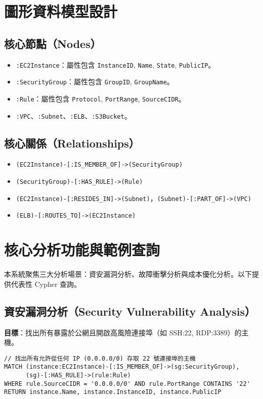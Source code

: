 \documentclass[11pt,a4paper]{ctexart}
\begin{document}
\section{圖形資料模型設計}

\subsection{核心節點（Nodes）}
\begin{itemize}[leftmargin=1.5em]
\item \texttt{:EC2Instance}：屬性包含 \texttt{InstanceID}, \texttt{Name}, \texttt{State}, \texttt{PublicIP}。
\item \texttt{:SecurityGroup}：屬性包含 \texttt{GroupID}, \texttt{GroupName}。
\item \texttt{:Rule}：屬性包含 \texttt{Protocol}, \texttt{PortRange}, \texttt{SourceCIDR}。
\item \texttt{:VPC}、\texttt{:Subnet}、\texttt{:ELB}、\texttt{:S3Bucket}。
\end{itemize}

\subsection{核心關係（Relationships）}
\begin{itemize}[leftmargin=1.5em]
\item \texttt{(EC2Instance)-[:IS\_MEMBER\_OF]->(SecurityGroup)}
\item \texttt{(SecurityGroup)-[:HAS\_RULE]->(Rule)}
\item \texttt{(EC2Instance)-[:RESIDES\_IN]->(Subnet)}，\texttt{(Subnet)-[:PART\_OF]->(VPC)}
\item \texttt{(ELB)-[:ROUTES\_TO]->(EC2Instance)}
\end{itemize}

\section{核心分析功能與範例查詢}\label{sec:analysis}
本系統聚焦三大分析場景：資安漏洞分析、故障衝擊分析與成本優化分析。以下提供代表性 Cypher 查詢。

\subsection{資安漏洞分析（Security Vulnerability Analysis）}
\textbf{目標}：找出所有暴露於公網且開啟高風險連接埠（如 SSH:22, RDP:3389）的主機。

\begin{lstlisting}[language=Cypher,caption={尋找允許 0.0.0.0/0 存取 22 埠之主機}]
// 找出所有允許從任何 IP (0.0.0.0/0) 存取 22 號連接埠的主機
MATCH (instance:EC2Instance)-[:IS_MEMBER_OF]->(sg:SecurityGroup),
      (sg)-[:HAS_RULE]->(rule:Rule)
WHERE rule.SourceCIDR = '0.0.0.0/0' AND rule.PortRange CONTAINS '22'
RETURN instance.Name, instance.InstanceID, instance.PublicIP
\end{lstlisting}
\end{document}
